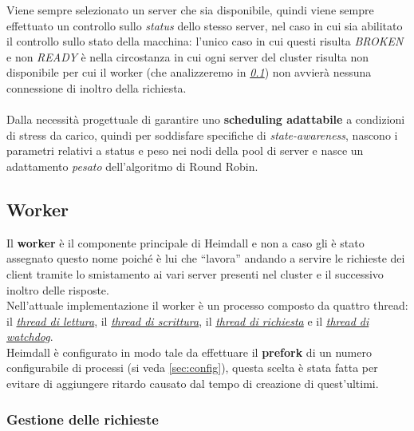 \documentclass[italian]{tktltiki2}
\begin{document}
Viene sempre selezionato un server che sia disponibile, quindi viene sempre effettuato un controllo sullo \emph{status} dello stesso server, nel caso in cui sia abilitato il controllo sullo stato della macchina: l'unico caso in cui questi risulta \emph{BROKEN} e non \emph{READY} è nella circostanza in cui ogni server del cluster risulta non disponibile per cui il worker (che analizzeremo in \emph{\ref{sec:worker}}) non avvierà nessuna connessione di inoltro della richiesta. \\\\
Dalla necessità progettuale di garantire uno \textbf{scheduling adattabile} a condizioni di stress da carico, quindi per soddisfare specifiche di \emph{state-awareness}, nascono i parametri relativi a status e peso nei nodi della pool di server e nasce un adattamento \emph{pesato} dell'algoritmo di Round Robin. \\

\subsection{Worker}
\label{sec:worker}
Il \textbf{worker} è il componente principale di Heimdall e non a caso gli è stato assegnato questo nome poiché è lui che ``lavora'' andando a servire le richieste dei client tramite lo smistamento ai vari server presenti nel cluster e il successivo inoltro delle risposte.
\\
Nell'attuale implementazione il worker è un processo composto da quattro thread: il \hyperref[sec:reader]{\emph{thread di lettura}}, il \hyperref[sec:writer]{\emph{thread di scrittura}}, il \hyperref[sec:request]{\emph{thread di richiesta}} e il \hyperref[sec:watchdog]{\emph{thread di watchdog}}.
\\
Heimdall è configurato in modo tale da effettuare il \textbf{prefork} di un numero configurabile di processi (si veda \ref{sec:config}), questa scelta è stata fatta per evitare di aggiungere ritardo causato dal tempo di creazione di quest'ultimi.

\subsubsection{Gestione delle richieste}
\label{sec:requests_management}
\end{document}
